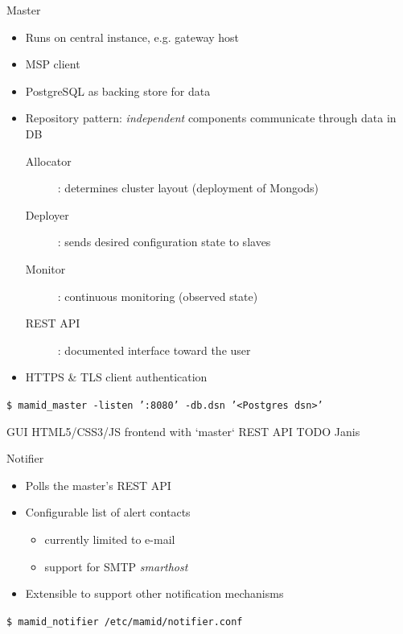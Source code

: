 \documentclass[11pt,aspectratio=169]{beamer}
\begin{document}
    
    \begin{frame}{Master}
        
        \begin{itemize}
            \item Runs on central instance, e.g. gateway host
            \item MSP client
            \item PostgreSQL as backing store for data
            \item Repository pattern: \textit{independent} components communicate through data in DB
            \begin{description}
                 \item[Allocator]: determines cluster layout (deployment of Mongods)
                 \item[Deployer]: sends desired configuration state to slaves
                 \item[Monitor]: continuous monitoring (observed state)
                 \item[REST API]: documented interface toward the user
            \end{description}
            \item HTTPS \& TLS client authentication
        \end{itemize}
        \vspace{15pt}
        \texttt{\$ mamid\_master -listen ':8080' -db.dsn '<Postgres dsn>'}
        
    \end{frame}   
    
    
    \begin{frame}{GUI}
           HTML5/CSS3/JS frontend with `master` REST API
           TODO Janis %
    \end{frame}
    
    \begin{frame}{Notifier}
        
        \begin{itemize}
            \item Polls the master's REST API
            \item Configurable list of alert contacts
            \begin{itemize}
                \item currently limited to e-mail
                \item support for SMTP \textit{smarthost}
            \end{itemize}
            \item Extensible to support other notification mechanisms %
        \end{itemize}
        \vspace{15pt}
        \texttt{\$ mamid\_notifier /etc/mamid/notifier.conf}
    \end{frame}
    
\end{document}
